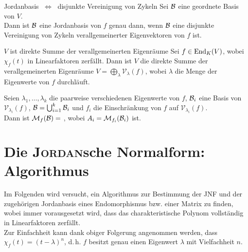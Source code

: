 \begin{Satz}{Jordanbasis $\;\Leftrightarrow\;$
             disjunkte Vereinigung von Zykeln}
    Sei $\mathcal{B}$ eine geordnete Basis von $V$. \\
    Dann ist $\mathcal{B}$ eine Jordanbasis von $f$ genau dann, wenn
    $\mathcal{B}$ eine disjunkte Vereinigung von Zykeln verallgemeinerter
    Eigenvektoren von $f$ ist.
\end{Satz}

\begin{Satz}{$V$ ist direkte Summe der verallgemeinerten Eigenräume}
    Sei $f \in \operatorname{End}_K(V)$, wobei $\chi_f(t)$ in Linearfaktoren zerfällt.
    Dann ist $V$ die direkte Summe der verallgemeinerten Eigenräume
    $V = \bigoplus_{\lambda} \mathcal{V}_\lambda(f)$, wobei $\lambda$
    die Menge der Eigenwerte von $f$ durchläuft.
\end{Satz}

\begin{Kor}
    Seien $\lambda_1, \dotsc, \lambda_k$ die paarweise verschiedenen
    Eigenwerte von $f$,
    $\mathcal{B}_i$ eine Basis von $\mathcal{V}_{\lambda_i}(f)$,
    $\mathcal{B} = \bigcup_{i=1}^k \mathcal{B}_i$ und
    $f_i$ die Einschränkung von $f$ auf $\mathcal{V}_{\lambda_{i}}(f)$. \\
    Dann ist $\mathcal{M}_{f}(\mathcal{B}) =$ ,
    wobei $A_i = \mathcal{M}_{f_i}(\mathcal{B}_i)$ ist.
\end{Kor}

\section{%
    Die \textsc{Jordan}sche Normalform: Algorithmus%
}

\begin{Bem}
    Im Folgenden wird versucht, ein Algorithmus zur Bestimmung der
    JNF und der zugehörigen Jordanbasis eines
    Endomorphismus bzw. einer Matrix zu finden, wobei immer vorausgesetzt wird,
    dass das charakteristische Polynom vollständig in Linearfaktoren
    zerfällt. \\
    Zur Einfachheit kann dank obiger Folgerung angenommen werden, dass
    $\chi_f(t) = (t - \lambda)^n$, d.\,h. $f$ besitzt genau einen
    Eigenwert $\lambda$ mit Vielfachheit $n$.
\end{Bem}

